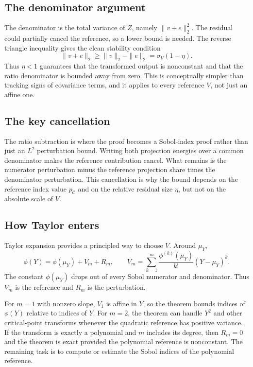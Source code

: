 \documentclass[11pt,letterpaper]{article}
\theoremstyle{remark}
\begin{document}
\subsection*{The denominator argument}

The denominator is the total variance of $Z$, namely $\|v+e\|_2^2$. The residual
could partially cancel the reference, so a lower bound is needed. The reverse
triangle inequality gives the clean stability condition
\begin{equation}
  \|v+e\|_2\geq \|v\|_2-\|e\|_2=\sigma_V(1-\eta).
\end{equation}
Thus $\eta<1$ guarantees that the transformed output is nonconstant and that the
ratio denominator is bounded away from zero. This is conceptually simpler than
tracking signs of covariance terms, and it applies to every reference $V$, not
just an affine one.

\subsection*{The key cancellation}

The ratio subtraction is where the proof becomes a Sobol-index proof rather than
just an $L^2$ perturbation bound. Writing both projection energies over a common
denominator makes the reference contribution cancel. What remains is the
numerator perturbation minus the reference projection share times the denominator
perturbation. This cancellation is why the bound depends on the reference index
value $p_{\mathscr C}$ and on the relative residual size $\eta$, but not on the
absolute scale of $V$.

\subsection*{How Taylor enters}

Taylor expansion provides a principled way to choose $V$. Around $\mu_Y$,
\begin{equation}
  \phi(Y)=\phi(\mu_Y)+V_m+R_m,
  \qquad
  V_m=\sum_{k=1}^m\frac{\phi^{(k)}(\mu_Y)}{k!}(Y-\mu_Y)^k.
\end{equation}
The constant $\phi(\mu_Y)$ drops out of every Sobol numerator and denominator.
Thus $V_m$ is the reference and $R_m$ is the perturbation.

For $m=1$ with nonzero slope, $V_1$ is affine in $Y$, so the theorem bounds
indices of $\phi(Y)$ relative to indices of $Y$. For $m=2$, the theorem can
handle $Y^2$ and other critical-point transforms whenever the quadratic
reference has positive variance. If the transform is exactly a polynomial and
$m$ includes its degree, then $R_m=0$ and the theorem is exact provided the
polynomial reference is nonconstant. The remaining task is to compute or
estimate the Sobol indices of the polynomial reference.
\end{document}
